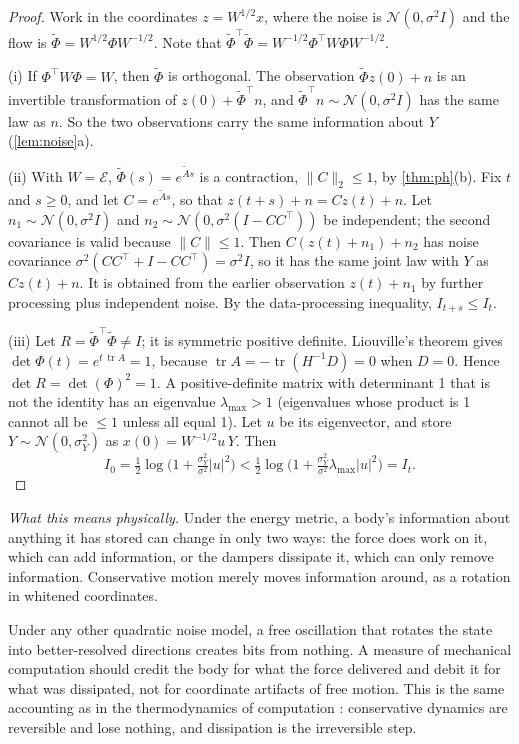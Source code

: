 \documentclass[11pt]{article}
\theoremstyle{definition}
\theoremstyle{remark}
\newcommand{\tr}{\operatorname{tr}}
\newcommand{\Em}{\mathcal{E}}         %
\newcommand{\At}{\tilde{A}}
\newcommand{\phys}[1]{\par\smallskip\noindent\textit{What this means physically.} #1\par}
\begin{document}
\begin{proof}
Work in the coordinates $z=W^{1/2}x$, where the noise is $\mathcal N(0,\sigma^2I)$ and the
flow is $\tilde\Phi=W^{1/2}\Phi W^{-1/2}$. Note that
$\tilde\Phi^\top\tilde\Phi=W^{-1/2}\Phi^\top W\Phi W^{-1/2}$.

(i) If $\Phi^\top W\Phi=W$, then $\tilde\Phi$ is orthogonal. The observation
$\tilde\Phi z(0)+n$ is an invertible transformation of $z(0)+\tilde\Phi^\top n$, and
$\tilde\Phi^\top n\sim\mathcal N(0,\sigma^2I)$ has the same law as $n$. So the two
observations carry the same information about $Y$ (\cref{lem:noise}a).

(ii) With $W=\Em$, $\tilde\Phi(s)=e^{\At s}$ is a contraction, $\|C\|_2\le1$, by
\cref{thm:ph}(b). Fix $t$ and $s\ge0$, and let $C=e^{\At s}$, so that
$z(t+s)+n=Cz(t)+n$. Let $n_1\sim\mathcal N(0,\sigma^2I)$ and $n_2\sim\mathcal
N(0,\sigma^2(I-CC^\top))$ be independent; the second covariance is valid because
$\|C\|\le1$. Then $C(z(t)+n_1)+n_2$ has noise covariance
$\sigma^2(CC^\top+I-CC^\top)=\sigma^2I$, so it has the same joint law with $Y$ as
$Cz(t)+n$. It is obtained from the earlier observation $z(t)+n_1$ by further processing
plus independent noise. By the data-processing inequality, $I_{t+s}\le I_t$.

(iii) Let $R=\tilde\Phi^\top\tilde\Phi\neq I$; it is symmetric positive definite.
Liouville's theorem gives $\det\Phi(t)=e^{t\,\tr A}=1$, because $\tr A=-\tr(H^{-1}D)=0$
when $D=0$. Hence $\det R=\det(\Phi)^2=1$. A positive-definite matrix with determinant 1
that is not the identity has an eigenvalue $\lambda_{\max}>1$ (eigenvalues whose product
is 1 cannot all be $\le1$ unless all equal 1). Let $u$ be its eigenvector, and store
$Y\sim\mathcal N(0,\sigma_Y^2)$ as $x(0)=W^{-1/2}u\,Y$. Then
\[
  I_0=\tfrac12\log\!\Big(1+\tfrac{\sigma_Y^2}{\sigma^2}|u|^2\Big)
  <\tfrac12\log\!\Big(1+\tfrac{\sigma_Y^2}{\sigma^2}\lambda_{\max}|u|^2\Big)=I_t .
\]
\end{proof}

\phys{Under the energy metric, a body's information about anything it has stored can change
in only two ways: the force does work on it, which can add information, or the dampers
dissipate it, which can only remove information. Conservative motion merely moves
information around, as a rotation in whitened coordinates.

Under any other quadratic noise model, a free oscillation that rotates the state into
better-resolved directions creates bits from nothing. A measure of mechanical computation
should credit the body for what the force delivered and debit it for what was dissipated,
not for coordinate artifacts of free motion. This is the same accounting as in the
thermodynamics of computation \citep{landauer1961irreversibility,bennett1982thermodynamics}:
conservative dynamics are reversible and lose nothing, and dissipation is the irreversible
step.}
\end{document}
